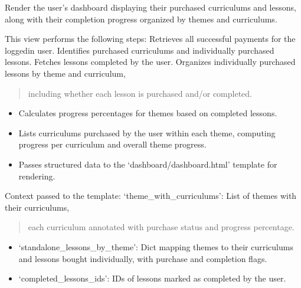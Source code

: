 \documentclass[letterpaper,10pt,english]{sphinxmanual}
\begin{document}
\begin{fulllineitems}
\label{\detokenize{dashboard:dashboard.views.dashboard}}
\pysigstartsignatures
\pysiglinewithargsret
{}
{}
{}
\pysigstopsignatures
\sphinxAtStartPar
Render the user’s dashboard displaying their purchased curriculums and lessons,
along with their completion progress organized by themes and curriculums.

\sphinxAtStartPar
This view performs the following steps:
\sphinxhyphen{} Retrieves all successful payments for the logged\sphinxhyphen{}in user.
\sphinxhyphen{} Identifies purchased curriculums and individually purchased lessons.
\sphinxhyphen{} Fetches lessons completed by the user.
\sphinxhyphen{} Organizes individually purchased lessons by theme and curriculum,
\begin{quote}

\sphinxAtStartPar
including whether each lesson is purchased and/or completed.
\end{quote}
\begin{itemize}
\item {} 
\sphinxAtStartPar
Calculates progress percentages for themes based on completed lessons.

\item {} 
\sphinxAtStartPar
Lists curriculums purchased by the user within each theme,
computing progress per curriculum and overall theme progress.

\item {} 
\sphinxAtStartPar
Passes structured data to the ‘dashboard/dashboard.html’ template for rendering.

\end{itemize}

\sphinxAtStartPar
Context passed to the template:
\sphinxhyphen{} ‘theme\_with\_curriculums’: List of themes with their curriculums,
\begin{quote}

\sphinxAtStartPar
each curriculum annotated with purchase status and progress percentage.
\end{quote}
\begin{itemize}
\item {} 
\sphinxAtStartPar
‘standalone\_lessons\_by\_theme’: Dict mapping themes to their curriculums
and lessons bought individually, with purchase and completion flags.

\item {} 
\sphinxAtStartPar
‘completed\_lessons\_ids’: IDs of lessons marked as completed by the user.


\end{itemize}
\end{fulllineitems}
\end{document}
